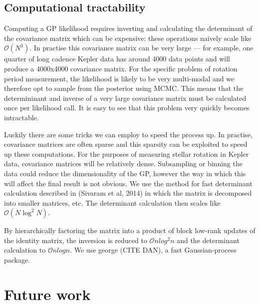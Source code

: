 \documentclass[12pt,preprint]{aastex}
\begin{document}
\subsection{Computational tractability}

Computing a GP likelihood requires inverting and calculating the determinant of the covariance matrix which can be expensive:
these operations naively scale like $\mathcal{O}(N^3)$.
In practise this covariance matrix can be very large --- for example, one quarter of long cadence Kepler data has around 4000 data points and will produce a 4000x4000 covariance matrix.
For the specific problem of rotation period measurement, the likelihood is likely to be very multi-modal and we therefore opt to sample from the posterior using MCMC.
This means that the determininant and inverse of a very large covariance matrix must be calculated once per likelihood call.
It is easy to see that this problem very quickly becomes intractable.

Luckily there are some tricks we can employ to speed the process up. %
In practise, covariance matrices are often sparse and this sparsity can be exploited to speed up these computations.
For the purposes of measuring stellar rotation in Kepler data, covariance matrices will be relatively dense.
Subsampling or binning the data could reduce the dimensionality of the GP, however the way in which this will affect the final result is not obvious.
We use the method for fast determinant calculation described in (Sivaram et al, 2014) in which the matrix is decomposed into smaller matrices, etc.
The determinant calculation then scales like $\mathcal{O}(N\log^2{N})$.

By hierarchically factoring the matrix into a product of block low-rank updates of the identity matrix, the inversion is reduced to $\mathcal{O}nlog^2n$ and the determinant calculation to $\mathcal{O}nlogn$.
We use george (CITE DAN), a fast Gaussian-process package.

\section{Future work}
\end{document}
